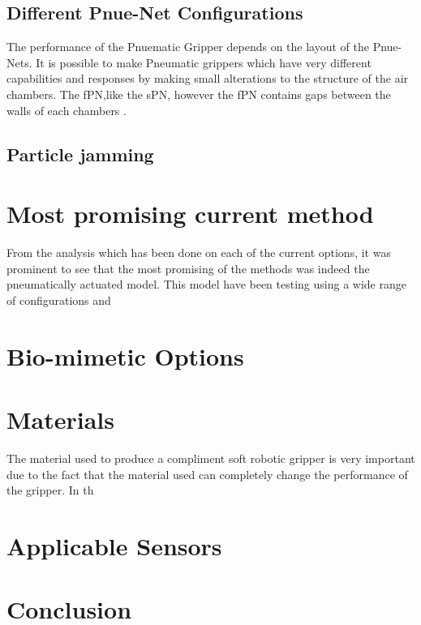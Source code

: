 \documentclass[11pt]{article}
\begin{document}
\subsection{Different Pnue-Net Configurations}
The performance of the Pnuematic Gripper depends on the layout of the Pnue-Nets. It is possible to make Pneumatic grippers which have very different capabilities and responses by making small alterations to the structure of the air chambers. The fPN,like the sPN, however the fPN contains gaps between the walls of each chambers \cite{mosadegh2014pneumatic}.
\subsection{Particle jamming}
\section{Most promising current method}
From the analysis which has been done on each of the current options, it was prominent to see that the most promising of the methods was indeed the pneumatically actuated model. This model have been testing using a wide range of configurations and 
\section{Bio-mimetic Options}
\section{Materials}
The material used to produce a compliment soft robotic gripper is very important due to the fact that the material used can completely change the performance of the gripper. In th
\section{Applicable Sensors}
\section{Conclusion}


\end{document}
